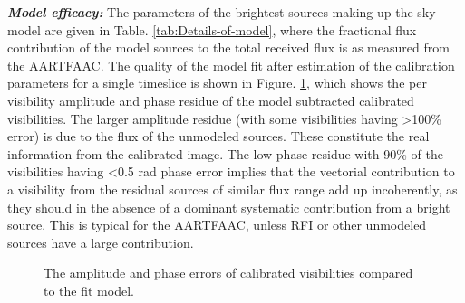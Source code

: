 \documentclass{aa}
\begin{document}
\textbf{\emph{Model efficacy: }}The parameters of the brightest sources
making up the sky model are given in Table. \ref{tab:Details-of-model},
where the fractional flux contribution of the model sources to the
total received flux is as measured from the AARTFAAC. The quality
of the model fit after estimation of the calibration parameters for
a single timeslice is shown in Figure. \ref{fig:The-model-amplitude},
which shows the per visibility amplitude and phase residue of the
model subtracted calibrated visibilities. The larger amplitude residue
(with some visibilities having >100\% error) is due to the flux of
the unmodeled sources. These constitute the real information from
the calibrated image. The low phase residue with 90\% of the visibilities
having <0.5 rad phase error implies that the vectorial contribution
to a visibility from the residual sources of similar flux range add
up incoherently, as they should in the absence of a dominant systematic
contribution from a bright source. This is typical for the AARTFAAC,
unless RFI or other unmodeled sources have a large contribution.

\begin{figure}[tbh]

\caption{\label{fig:The-model-amplitude}The amplitude and phase errors of
calibrated visibilities compared to the fit model. }
\end{figure}
\end{document}
